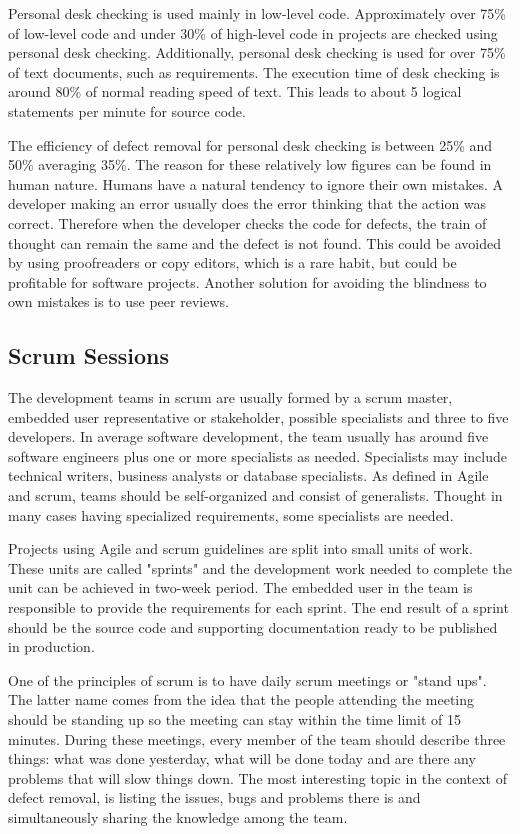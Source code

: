 Personal desk checking is used mainly in low-level code. Approximately over 75\% of low-level code and under 30\% of high-level code in projects are checked using personal desk checking. Additionally, personal desk checking is used for over 75\% of text documents, such as requirements. The execution time of desk checking is around 80\% of normal reading speed of text. This leads to about 5 logical statements per minute for source code.

The efficiency of defect removal for personal desk checking is between 25\% and 50\% averaging 35\%. The reason for these relatively low figures can be found in human nature. Humans have a natural tendency to ignore their own mistakes. A developer making an error usually does the error thinking that the action was correct. Therefore when the developer checks the code for defects, the train of thought can remain the same and the defect is not found. This could be avoided by using proofreaders or copy editors, which is a rare habit, but could be profitable for software projects. Another solution for avoiding the blindness to own mistakes is to use peer reviews.


\subsection{Scrum Sessions} 

The development teams in scrum are usually formed by a scrum master, embedded user representative or stakeholder, possible specialists and three to five developers. In average software development, the team usually has around five software engineers plus one or more specialists as needed. Specialists may include technical writers, business analysts or database specialists. As defined in Agile and scrum, teams should be self-organized and consist of generalists. Thought in many cases having specialized requirements, some specialists are needed.

Projects using Agile and scrum guidelines are split into small units of work. These units are called "sprints" and the development work needed to complete the unit can be achieved in two-week period. The embedded user in the team is responsible to provide the requirements for each sprint. The end result of a sprint should be the source code and supporting documentation ready to be published in production.

One of the principles of scrum is to have daily scrum meetings or "stand ups". The latter name comes from the idea that the people attending the meeting should be standing up so the meeting can stay within the time limit of 15 minutes. During these meetings, every member of the team should describe three things: what was done yesterday, what will be done today and are there any problems that will slow things down. The most interesting topic in the context of defect removal, is listing the issues, bugs and problems there is and simultaneously sharing the knowledge among the team.

